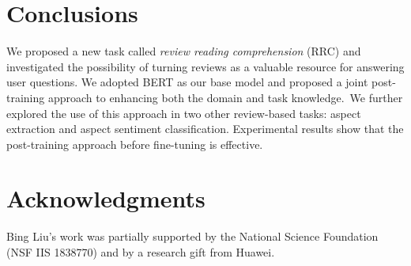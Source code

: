 \documentclass[11pt,a4paper]{article}
\begin{document}
\section{Conclusions}
We proposed a new task called \textit{review reading comprehension} (RRC) and investigated the possibility of turning reviews as a valuable resource for answering user questions.
We adopted BERT as our base model and proposed a joint post-training approach to enhancing both the domain and task knowledge.~We further explored the use of this approach in two other review-based tasks: aspect extraction and aspect sentiment classification. 
Experimental results show that the post-training approach before fine-tuning is effective.

\section*{Acknowledgments}
Bing Liu's work was partially supported by the National Science
Foundation (NSF IIS 1838770) and by a research gift from Huawei.



\end{document}
